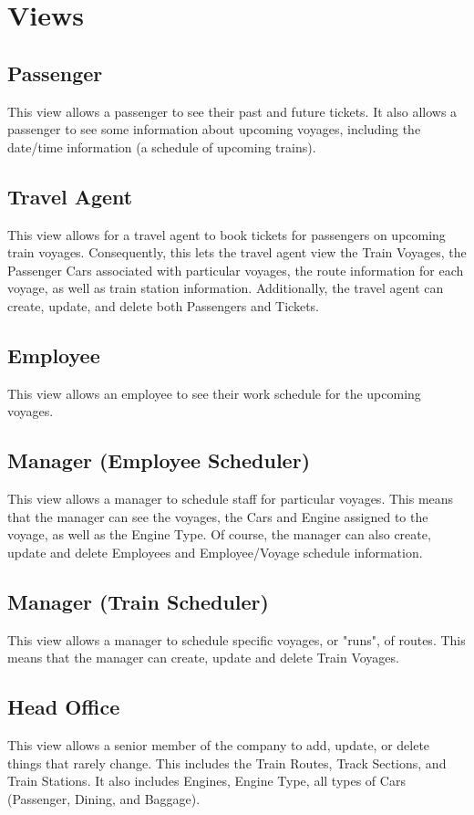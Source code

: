 \documentclass[a4paper]{article}
\begin{document}
\section{Views}
\subsection*{Passenger}
This view allows a passenger to see their past and future tickets. It also allows a passenger to see some information about upcoming voyages, including the date/time information (a schedule of upcoming trains).

\subsection*{Travel Agent}
This view allows for a travel agent to book tickets for passengers on upcoming train voyages. Consequently, this lets the travel agent view the Train Voyages, the Passenger Cars associated with particular voyages, the route information for each voyage, as well as train station information. Additionally, the travel agent can create, update, and delete both Passengers and Tickets.

\subsection*{Employee}
This view allows an employee to see their work schedule for the upcoming voyages.

\subsection*{Manager (Employee Scheduler)}
This view allows a manager to schedule staff for particular voyages. This means that the manager can see the voyages, the Cars and Engine assigned to the voyage, as well as the Engine Type. Of course, the manager can also create, update and delete Employees and Employee/Voyage schedule information.

\subsection*{Manager (Train Scheduler)}
This view allows a manager to schedule specific voyages, or "runs", of routes. This means that the manager can create, update and delete Train Voyages.

\subsection*{Head Office}
This view allows a senior member of the company to add, update, or delete things that rarely change. This includes the Train Routes, Track Sections, and Train Stations. It also includes Engines, Engine Type, all types of Cars (Passenger, Dining, and Baggage).
\end{document}

